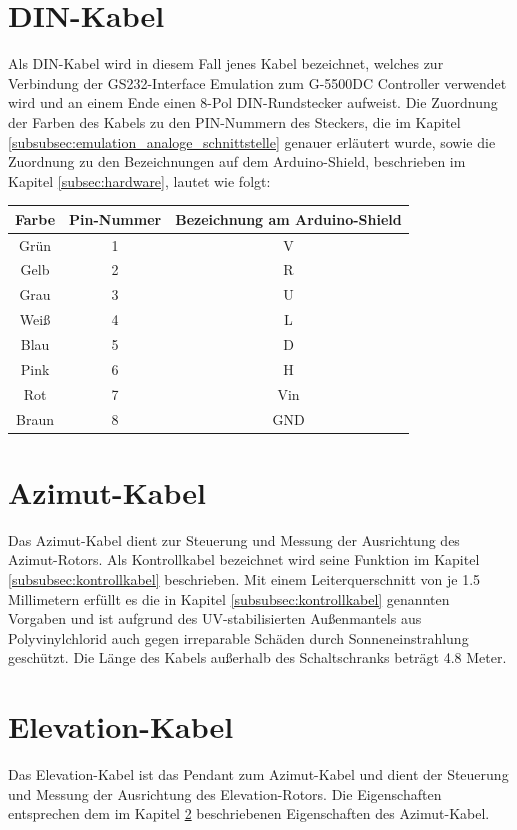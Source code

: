 \section{DIN-Kabel}
\label{sec:DIN-Kabel}
Als DIN-Kabel wird in diesem Fall jenes Kabel bezeichnet, welches zur Verbindung der GS232-Interface Emulation zum G-5500DC Controller verwendet wird und an einem Ende einen 8-Pol DIN-Rundstecker aufweist. Die Zuordnung der Farben des Kabels zu den PIN-Nummern des Steckers, die im Kapitel \ref{subsubsec:emulation_analoge_schnittstelle} genauer erläutert wurde, sowie die Zuordnung zu den Bezeichnungen auf dem Arduino-Shield, beschrieben im Kapitel \ref{subsec:hardware}, lautet wie folgt:

\begin{table}
	\centering
	\begin{tabular}{c|c|c}
		\textbf{Farbe} & \textbf{Pin-Nummer} & \textbf{Bezeichnung am Arduino-Shield} \\
		\hline
		Grün & 1 & V \\
		Gelb & 2 & R \\
		Grau & 3 & U \\
		Weiß & 4 & L \\
		Blau & 5 & D \\
		Pink & 6 & H \\
		Rot & 7 & Vin \\
		Braun & 8 & GND \\
	\end{tabular}
\end{table}

\section{Azimut-Kabel}
\label{sec:azimutkabel}
Das Azimut-Kabel dient zur Steuerung und Messung der Ausrichtung des Azimut-Rotors. Als Kontrollkabel bezeichnet wird seine Funktion im Kapitel \ref{subsubsec:kontrollkabel} beschrieben. Mit einem Leiterquerschnitt von je 1.5 Millimetern erfüllt es die in Kapitel \ref{subsubsec:kontrollkabel} genannten Vorgaben und ist aufgrund des UV-stabilisierten Außenmantels aus Polyvinylchlorid auch gegen irreparable Schäden durch Sonneneinstrahlung geschützt. Die Länge des Kabels außerhalb des Schaltschranks beträgt 4.8 Meter. 

\section{Elevation-Kabel}
\label{sec:Elevation-Kabel}
Das Elevation-Kabel ist das Pendant zum Azimut-Kabel und dient der Steuerung und Messung der Ausrichtung des Elevation-Rotors. Die Eigenschaften entsprechen dem im Kapitel \ref{sec:azimutkabel} beschriebenen Eigenschaften des Azimut-Kabel.

